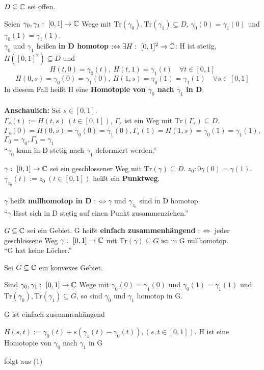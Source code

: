 \documentclass[a4paper,twoside,DIV15,BCOR12mm]{scrbook}
\def\Tr{\text{Tr}}
\begin{document}
\begin{definition}
$D\subseteq\mathbb{C}$ sei offen.
\begin{liste}
\item Seien $\gamma_0,\gamma_1:\ [0,1]\to\MdC$ Wege mit $\Tr(\gamma_0),\Tr(\gamma_1)\subseteq D$, $\gamma_0(0)=\gamma_1(0)$ und $\gamma_0(1)=\gamma_1(1)$.\\
$\gamma_0$ und $\gamma_1$ heißen \textbf{in D homotop} $:\Leftrightarrow \exists H:\ [0,1]^2\to\MdC$: H ist stetig, $H([0,1]^2)\subseteq D$ und
\[H(t,0)=\gamma_0(t),\ H(t,1)=\gamma_1(t)\quad\forall t\in[0,1]\]
\[H(0,s)=\gamma_0(0)=\gamma_1(0),\ H(1,s)=\gamma_0(1)=\gamma_1(1)\quad\forall s\in[0,1]\]
In diesem Fall heißt H eine \textbf{Homotopie von $\gamma_0$ nach $\gamma_1$ in D}.\\
~\\
\textbf{Anschaulich:} Sei $s\in[0,1]$.\\
$\Gamma_s(t):=H(t,s)\ (t\in[0,1])$, $\Gamma_s$ ist ein Weg mit $\Tr(\Gamma_s)\subseteq D$.
$\Gamma_s(0)=H(0,s)=\gamma_0(0)=\gamma_1(0), \Gamma_s(1)=H(1,s)=\gamma_0(1)=\gamma_1(1)$, $\Gamma_0=\gamma_0, \Gamma_1=\gamma_1$\\
"`$\gamma_0$ kann in D stetig nach $\gamma_1$ deformiert werden."'
\item $\gamma:\ [0,1]\to\MdC$ sei ein geschlossener Weg mit $\Tr(\gamma)\subseteq D$. $z_0:0\gamma(0)=\gamma(1)$.\\
$\gamma_{z_0}(t):=z_0\ (t\in[0,1])$ heißt ein \textbf{Punktweg}.\\
~\\
$\gamma$ heißt \textbf{nullhomotop in D} $:\Leftrightarrow \gamma$ und $\gamma_{z_0}$ sind in D homotop.\\
"`$\gamma$ lässt sich in D stetig auf einen Punkt zusammenziehen."'
\item $G\subseteq\mathbb{C}$ sei ein Gebiet. G heißt \textbf{einfach zusammenhängend} $:\Leftrightarrow$ jeder geschlossene Weg $\gamma:\ [0,1]\to\MdC$ mit $\Tr(\gamma)\subseteq G$ ist in G nullhomotop.\\
"`G hat keine Löcher."'
\end{liste}
\end{definition}
\begin{satz} 
Sei $G\subseteq\mathbb{C}$ ein konvexes Gebiet. 
\begin{liste}
\item Sind $\gamma_0,\gamma_1:\ [0,1]\to\MdC$ Wege mit $\gamma_0(0)=\gamma_1(0)$ und $\gamma_0(1)=\gamma_1(1)$ und $\Tr(\gamma_0),\Tr(\gamma_1)\subseteq G$, so sind $\gamma_0$ und $\gamma_1$ homotop in G.
\item G ist einfach zusammenhängend
\end{liste}
\end{satz}
\begin{beweis}
\begin{liste}
\item $H(s,t):=\gamma_0(t)+s(\gamma_1(t)-\gamma_0(t)), (s,t\in[0,1])$. H ist eine Homotopie von $\gamma_0$ nach $\gamma_1$ in G
\item folgt aus (1)
\end{liste}
\end{beweis}
\end{document}
